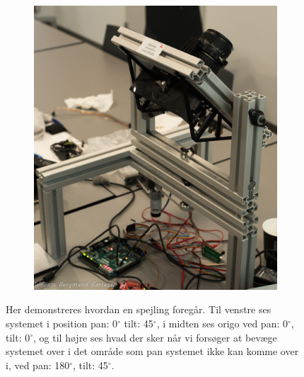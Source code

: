 \begin{figure}[!h]
\begin{subfigure}[b]{0.3\textwidth}
        \caption{}
        \label{fig:Nulpunkt}
    \end{subfigure}
    \begin{subfigure}[b]{0.3\textwidth}
        \includegraphics[width=1\textwidth]{Billeder/Tilt315deg.jpg}
        \caption{}
        \label{fig:tilt_spejl}
    \end{subfigure}
   \caption{Her demonstreres hvordan en spejling foregår. Til venstre ses systemet i position pan: 0$^{\circ}$ tilt: 45$^{\circ}$, i midten ses origo ved pan: 0$^{\circ}$, tilt: 0$^{\circ}$, og til højre ses hvad der sker når vi forsøger at bevæge systemet over i det område som pan systemet ikke kan komme over i, ved pan: 180$^{\circ}$, tilt: 45$^{\circ}$.}
\end{figure}

